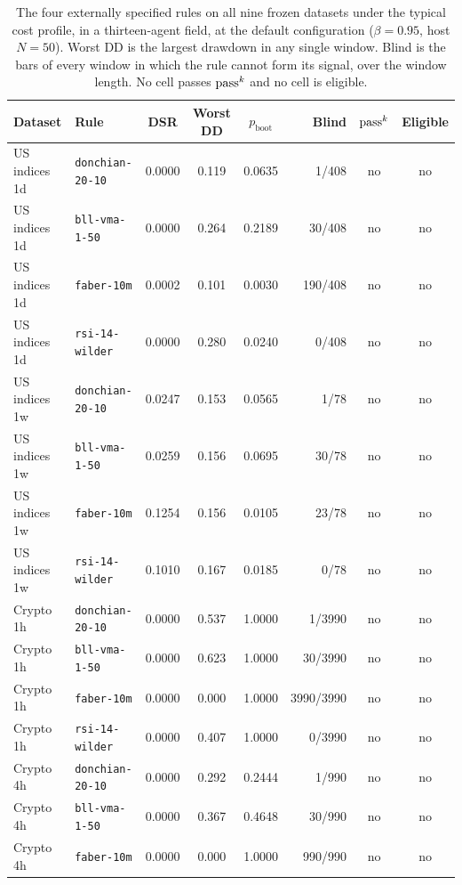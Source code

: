 \begin{table}[t]
\centering
\footnotesize
\caption{The four externally specified rules on all nine frozen datasets under the typical cost profile, in a thirteen-agent field, at the default configuration ($\beta = 0.95$, host $N = 50$). Worst DD is the largest drawdown in any single window. Blind is the bars of every window in which the rule cannot form its signal, over the window length. No cell passes $\passk$ and no cell is eligible.}
\label{tab:external}
\setlength{\tabcolsep}{4pt}
\begin{tabular}{llS[table-format=1.4]S[table-format=1.3]S[table-format=1.4]rcc}
\toprule
Dataset & Rule & {DSR} & {Worst DD} & {$p_{\text{boot}}$} & Blind & $\passk$ & Eligible \\
\midrule
US indices 1d & \texttt{donchian-20-10} & 0.0000 & 0.119 & 0.0635 & 1/408 & no & no \\
US indices 1d & \texttt{bll-vma-1-50} & 0.0000 & 0.264 & 0.2189 & 30/408 & no & no \\
US indices 1d & \texttt{faber-10m} & 0.0002 & 0.101 & 0.0030 & 190/408 & no & no \\
US indices 1d & \texttt{rsi-14-wilder} & 0.0000 & 0.280 & 0.0240 & 0/408 & no & no \\
US indices 1w & \texttt{donchian-20-10} & 0.0247 & 0.153 & 0.0565 & 1/78 & no & no \\
US indices 1w & \texttt{bll-vma-1-50} & 0.0259 & 0.156 & 0.0695 & 30/78 & no & no \\
US indices 1w & \texttt{faber-10m} & 0.1254 & 0.156 & 0.0105 & 23/78 & no & no \\
US indices 1w & \texttt{rsi-14-wilder} & 0.1010 & 0.167 & 0.0185 & 0/78 & no & no \\
Crypto 1h & \texttt{donchian-20-10} & 0.0000 & 0.537 & 1.0000 & 1/3990 & no & no \\
Crypto 1h & \texttt{bll-vma-1-50} & 0.0000 & 0.623 & 1.0000 & 30/3990 & no & no \\
Crypto 1h & \texttt{faber-10m} & 0.0000 & 0.000 & 1.0000 & 3990/3990 & no & no \\
Crypto 1h & \texttt{rsi-14-wilder} & 0.0000 & 0.407 & 1.0000 & 0/3990 & no & no \\
Crypto 4h & \texttt{donchian-20-10} & 0.0000 & 0.292 & 0.2444 & 1/990 & no & no \\
Crypto 4h & \texttt{bll-vma-1-50} & 0.0000 & 0.367 & 0.4648 & 30/990 & no & no \\
Crypto 4h & \texttt{faber-10m} & 0.0000 & 0.000 & 1.0000 & 990/990 & no & no \\

\end{tabular}
\end{table}
